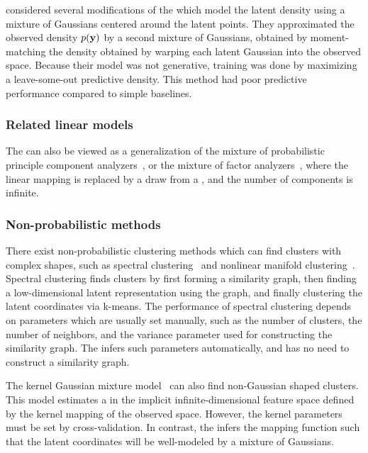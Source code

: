 \citet{nickisch2010gaussian} considered several modifications of the \gplvm{} which model the latent density using a mixture of Gaussians centered around the latent points.
They approximated the observed density $p({\bf{y}})$ by a second mixture of Gaussians, obtained by moment-matching the density obtained by warping each latent Gaussian into the observed space.
Because their model was not generative, training was done by maximizing a leave-some-out predictive density.
This method had poor predictive performance compared to simple baselines.


\subsubsection{Related linear models}
The \iwmm{} can also be viewed as a generalization of the mixture of probabilistic principle component analyzers~\citep{tipping1999mixtures}, or the mixture of factor analyzers~\citep{ghahramani2000variational}, where the linear mapping is replaced by a draw from a \gp{}, and the number of components is infinite.


\subsubsection{Non-probabilistic methods}
There exist non-probabilistic clustering methods which can find clusters with complex shapes, such as spectral clustering~\citep{ng2002spectral} and nonlinear manifold clustering~\citep{cao2006nonlinear,elhamifar2011sparse}.
Spectral clustering finds clusters by first forming a similarity graph, then finding a low-dimensional latent representation using the graph, and finally clustering the latent coordinates via k-means.
The performance of spectral clustering depends on parameters which are usually set manually, such as the number of clusters, the number of neighbors, and the variance parameter used for constructing the similarity graph.
The \iwmm{} infers such parameters automatically, and has no need to construct a similarity graph.

The kernel Gaussian mixture model~\citep{wang2003kernel} can also find non-Gaussian shaped clusters.
This model estimates a \GMM{} in the implicit infinite-dimensional feature space defined by the kernel mapping of the observed space.
However, the kernel parameters must be set by cross-validation.
In contrast, the \iwmm{} infers the mapping function such that the latent coordinates will be well-modeled by a mixture of Gaussians.


